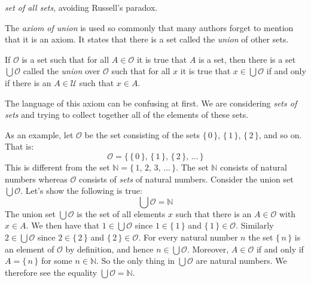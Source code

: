             \textit{set of all sets}, avoiding Russell's paradox.
            \par\hfill\par
            The \textit{axiom of union} is used so commonly that many authors
            forget to mention that it is an axiom. It states that there is a
            set called the \textit{union} of other sets.
            \begin{axiom}
                If $\mathcal{O}$ is a set such that for all $A\in\mathcal{O}$ it
                is true that $A$ is a set, then there is a set
                $\bigcup\mathcal{O}$ called the \textit{union} over
                $\mathcal{O}$ such that for all $x$ it is true that
                $x\in\bigcup\mathcal{O}$ if and only if there is an
                $A\in\mathcal{U}$ such that $x\in{A}$.
            \end{axiom}
            The language of this axiom can be confusing at first. We are
            considering \textit{sets of sets} and trying to collect together
            all of the elements of these sets.
            \begin{example}
                As an example, let $\mathcal{O}$ be the set consisting of
                the sets $\{\,0\,\}$, $\{\,1\,\}$, $\{\,2\,\}$, and so on.
                That is:
                \begin{equation}
                    \mathcal{O}=
                    \big\{\,\{\,0\,\},\,\{\,1\,\},\,\{\,2\,\},\,\dots\,\big\}
                \end{equation}
                This is different from the set
                $\mathbb{N}=\{\,1,\,2,\,3,\,\dots\,\}$. The set $\mathbb{N}$
                consists of natural numbers whereas $\mathcal{O}$ consists of
                \textit{sets} of natural numbers. Consider the union set
                $\bigcup\mathcal{O}$. Let's show the following is true:
                \begin{equation}
                    \bigcup\mathcal{O}=\mathbb{N}
                \end{equation}
                The union set $\bigcup\mathcal{O}$ is the set of all elements
                $x$ such that there is an $A\in\mathcal{O}$ with $x\in{A}$.
                We then have that $1\in\bigcup\mathcal{O}$ since
                $1\in\{\,1\,\}$ and $\{\,1\,\}\in\mathcal{O}$. Similarly
                $2\in\bigcup\mathcal{O}$ since $2\in\{\,2\,\}$ and
                $\{\,2\,\}\in\mathcal{O}$. For every natural number
                $n$ the set $\{\,n\,\}$ is an element of $\mathcal{O}$ by
                definition, and hence $n\in\bigcup\mathcal{O}$. Moreover,
                $A\in\mathcal{O}$ if and only if $A=\{\,n\,\}$ for some
                $n\in\mathbb{N}$. So the only thing in $\bigcup\mathcal{O}$
                are natural numbers. We therefore
                see the equality $\bigcup\mathcal{O}=\mathbb{N}$.
            \end{example}
